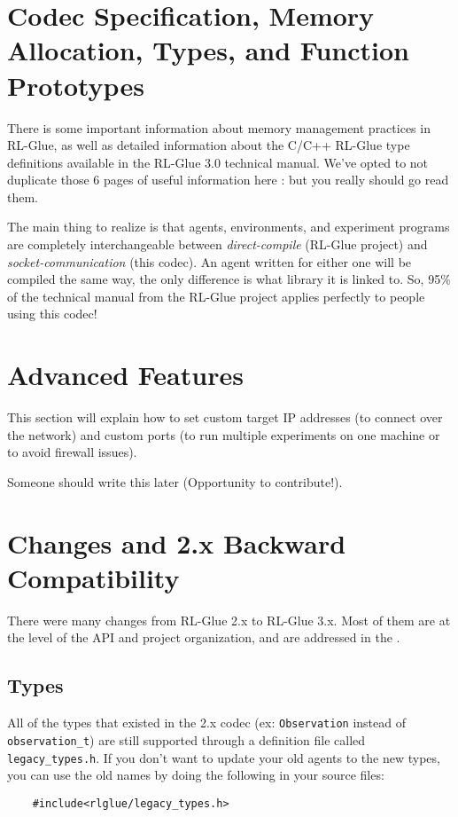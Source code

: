\documentclass[11pt]{article}
\begin{document}
\section{Codec Specification, Memory Allocation, Types, and Function Prototypes}
There is some important information about memory management practices in RL-Glue, as well as detailed information about the C/C++ RL-Glue type definitions available in the 
RL-Glue 3.0 technical manual.  We've opted to not duplicate those 6 pages of useful information here : but you really should go read them.

The main thing to realize is that agents, environments, and experiment programs are completely interchangeable between \textit{direct-compile} (RL-Glue project) and \textit{socket-communication}
(this codec).  An agent written for either one will be compiled the same way, the only difference is what library it is linked to.  So, 95\% of the technical manual from the RL-Glue project applies 
perfectly to people using this codec! 




\section{Advanced Features}
This section will explain how to set custom target IP addresses (to connect over the network) and custom ports (to run multiple experiments on one machine or to avoid firewall issues).

Someone should write this later (Opportunity to contribute!).

\section{Changes and 2.x Backward Compatibility}
There were many changes from RL-Glue 2.x to RL-Glue 3.x.  Most of them are at the level of the API and project organization, and are addressed in the .

\subsection{Types}
All of the types that existed in the 2.x codec (ex: \texttt{Observation} instead of \texttt{observation\_t}) are still supported through a definition file called 
\texttt{legacy\_types.h}.  If you don't want to update your old agents to the new types, you can use the old names by doing the following in your source files:
\begin{verbatim}
	#include<rlglue/legacy_types.h>
\end{verbatim}
\end{document}
